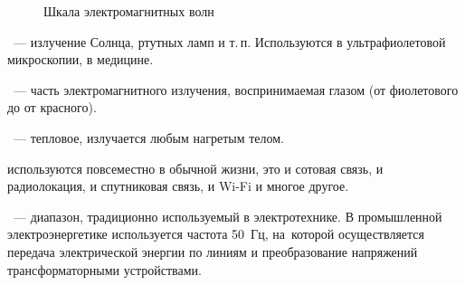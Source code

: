 \begin{figure}[!h]
	\caption{Шкала электромагнитных волн}
\end{figure}
~--- излучение Солнца, ртутных ламп и т.\,п. Используются в ультрафиолетовой микроскопии, в медицине.

~--- часть электромагнитного излучения, воспринимаемая глазом (от фиолетового до от красного).

~--- тепловое, излучается любым нагретым телом.

 используются повсеместно в обычной жизни, это и сотовая связь, и радиолокация, и спутниковая связь, и Wi-Fi и многое другое.

~--- диапазон, традиционно используемый в электротехнике. В промышленной электроэнергетике используется частота 50~Гц, на~которой осуществляется передача электрической энергии по линиям и преобразование напряжений трансформаторными устройствами.
